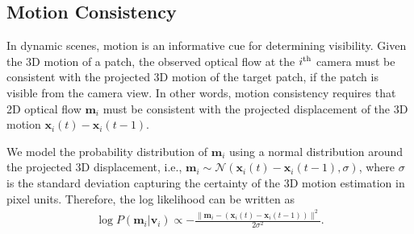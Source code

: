 \documentclass[10pt,twocolumn,letterpaper]{article}
\begin{document}
\subsection{Motion Consistency}\label{sub:Motion-Cue}
In dynamic scenes, motion is an informative cue for determining visibility. Given the 3D motion of a patch, the observed optical flow at the $i^{\rm th}$ camera must be consistent with the projected 3D motion of the target patch, if the patch is visible from the camera view. In other words, motion consistency requires that 2D optical flow $\mathbf{m}_i$ must be consistent with the projected displacement of the 3D motion $\mathbf{x}_i(t) - \mathbf{x}_i(t-1)$.

We model the probability distribution of $\mathbf{m}_i$ using a normal distribution around the projected 3D displacement, i.e., $\mathbf{m}_i \sim \mathcal{N}\left( \mathbf{x}_i(t) - \mathbf{x}_i(t-1), \sigma \right) $, where $\sigma$ is the standard deviation capturing the certainty of the 3D motion estimation in pixel units. Therefore, the log likelihood can be written as 
\begin{eqnarray}
\log P( \mathbf{m}_i | \mathbf{v}_i) \propto -\frac{\| \mathbf{m}_i - \left( \mathbf{x}_i(t) - \mathbf{x}_i(t-1) \right)  \|^2}{2\sigma^2}.
\label{eq:eq_motion}
\end{eqnarray}
\end{document}
